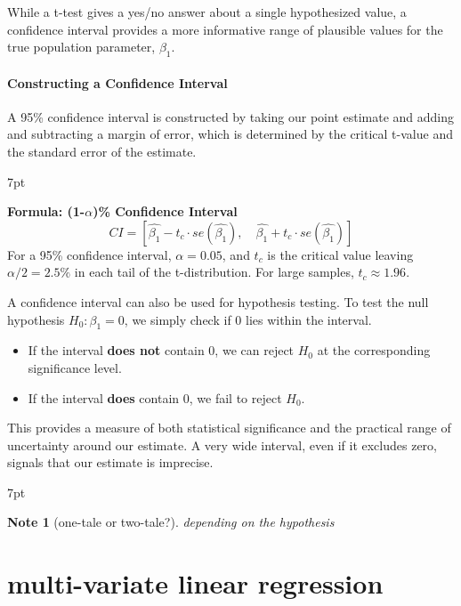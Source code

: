 \documentclass{article}
\providecommand{\tightlist}{
  \setlength{\itemsep}{0pt}
  \setlength{\parskip}{0pt}}
\newenvironment{blueblock}{
\def\FrameCommand{
  \hspace{1pt}
    {\color{DarkBlue}
    \vrule width 2pt}
    {\color{blueshade}
    \vrule width 4pt}
  \colorbox{blueshade}
}
\MakeFramed{
  \advance
  \hsize-
  \width
  \FrameRestore}
\noindent\hspace{-4.55pt}%
\begin{adjustwidth}{}{7pt}
\vspace{2pt}\vspace{2pt}
}
{\vspace{2pt}\end{adjustwidth}\endMakeFramed}
\newenvironment{greenblock}{%
\def\FrameCommand{%
  \hspace{1pt}%
    {\color{Green}%
    \vrule width 2pt}%
    {\color{greenshade}%
    \vrule width 4pt}%
  \colorbox{greenshade}%
}%
\MakeFramed{%
  \advance%
  \hsize-%
  \width%
  \FrameRestore}%
\noindent\hspace{-4.55pt}%
\begin{adjustwidth}{}{7pt}%
\vspace{2pt}\vspace{2pt}%
}
{%
\vspace{2pt}\end{adjustwidth}\endMakeFramed%
}
\newtheorem{note}{Note}
\begin{document}
While a t-test gives a yes/no answer about a single hypothesized value, a confidence interval provides a more informative range of plausible values for the true population parameter, $\beta_1$.

\paragraph{Constructing a Confidence Interval}
A 95\% confidence interval is constructed by taking our point estimate and adding and subtracting a margin of error, which is determined by the critical t-value and the standard error of the estimate.

\begin{greenblock}
\textbf{Formula: (1-$\alpha$)\% Confidence Interval}
\begin{equation}
  CI = [\hat{\beta_1} - t_{c} \cdot se(\hat{\beta_1}), \quad \hat{\beta_1} + t_{c} \cdot se(\hat{\beta_1})]
\end{equation}
For a 95\% confidence interval, $\alpha=0.05$, and $t_c$ is the critical value leaving $\alpha/2 = 2.5\%$ in each tail of the t-distribution. For large samples, $t_c \approx 1.96$.
\end{greenblock}

A confidence interval can also be used for hypothesis testing. To test the null hypothesis $H_0: \beta_1=0$, we simply check if 0 lies within the interval.
\begin{itemize}
\tightlist
    \item If the interval \textbf{does not} contain 0, we can reject $H_0$ at the corresponding significance level.
    \item If the interval \textbf{does} contain 0, we fail to reject $H_0$.
\end{itemize}
This provides a measure of both statistical significance and the practical range of uncertainty around our estimate. A very wide interval, even if it excludes zero, signals that our estimate is imprecise.

\begin{blueblock}
\begin{note}[one-tale or two-tale?]
depending on the hypothesis
\end{note}
\end{blueblock}



\section{multi-variate linear regression} %
\label{sec:multi_variate_linear_regression}
\end{document}
